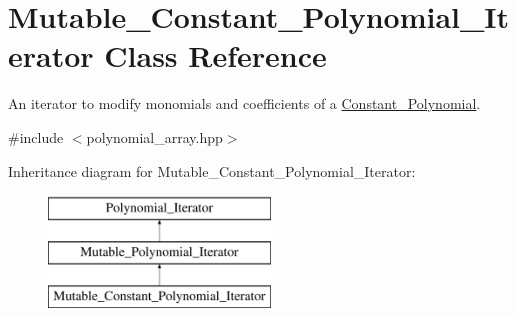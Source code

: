 \hypertarget{class_mutable___constant___polynomial___iterator}{}\section{Mutable\+\_\+\+Constant\+\_\+\+Polynomial\+\_\+\+Iterator Class Reference}
\label{class_mutable___constant___polynomial___iterator}


An iterator to modify monomials and coefficients of a \hyperlink{class_constant___polynomial}{Constant\+\_\+\+Polynomial}.  




{\ttfamily \#include $<$polynomial\+\_\+array.\+hpp$>$}

Inheritance diagram for Mutable\+\_\+\+Constant\+\_\+\+Polynomial\+\_\+\+Iterator\+:\begin{figure}[H]
\begin{center}
\leavevmode
\includegraphics[height=3.000000cm]{class_mutable___constant___polynomial___iterator}
\end{center}
\end{figure}
